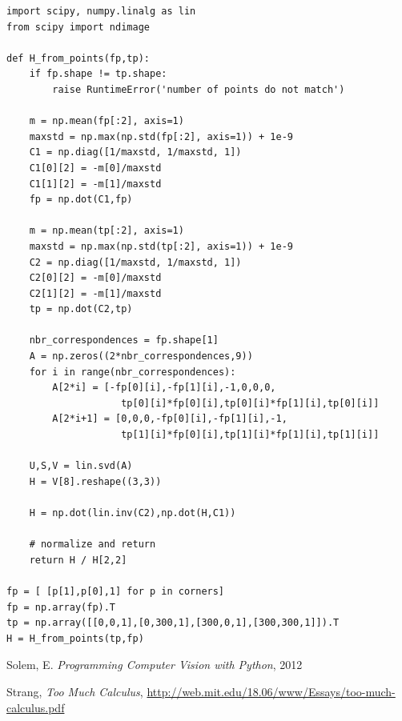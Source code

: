 \documentclass{article}
\begin{document}
\begin{verbatim}
import scipy, numpy.linalg as lin
from scipy import ndimage

def H_from_points(fp,tp):
    if fp.shape != tp.shape:
        raise RuntimeError('number of points do not match')
        
    m = np.mean(fp[:2], axis=1)
    maxstd = np.max(np.std(fp[:2], axis=1)) + 1e-9
    C1 = np.diag([1/maxstd, 1/maxstd, 1]) 
    C1[0][2] = -m[0]/maxstd
    C1[1][2] = -m[1]/maxstd
    fp = np.dot(C1,fp)
    
    m = np.mean(tp[:2], axis=1)
    maxstd = np.max(np.std(tp[:2], axis=1)) + 1e-9
    C2 = np.diag([1/maxstd, 1/maxstd, 1])
    C2[0][2] = -m[0]/maxstd
    C2[1][2] = -m[1]/maxstd
    tp = np.dot(C2,tp)
    
    nbr_correspondences = fp.shape[1]
    A = np.zeros((2*nbr_correspondences,9))
    for i in range(nbr_correspondences):        
        A[2*i] = [-fp[0][i],-fp[1][i],-1,0,0,0,
                    tp[0][i]*fp[0][i],tp[0][i]*fp[1][i],tp[0][i]]
        A[2*i+1] = [0,0,0,-fp[0][i],-fp[1][i],-1,
                    tp[1][i]*fp[0][i],tp[1][i]*fp[1][i],tp[1][i]]
    
    U,S,V = lin.svd(A)
    H = V[8].reshape((3,3))    
    
    H = np.dot(lin.inv(C2),np.dot(H,C1))
    
    # normalize and return
    return H / H[2,2]

fp = [ [p[1],p[0],1] for p in corners]
fp = np.array(fp).T
tp = np.array([[0,0,1],[0,300,1],[300,0,1],[300,300,1]]).T
H = H_from_points(tp,fp)
\end{verbatim}


  

\begin{thebibliography}{1}

Solem, E. \emph{Programming Computer Vision with Python}, 2012

Strang, \emph{Too Much Calculus}, \url{http://web.mit.edu/18.06/www/Essays/too-much-calculus.pdf}

\end{thebibliography}
\end{document}
